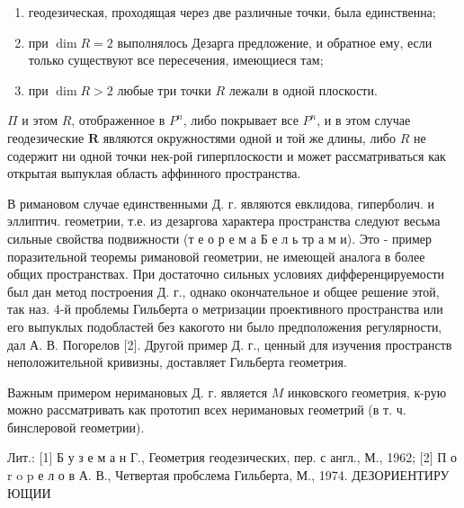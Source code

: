 \documentclass[10pt]{article}
\begin{document}
\begin{enumerate}

  \item геодезическая, проходящая через две различные точки, была единственна;



  \item при $\operatorname{dim} R=2$ выполнялось Дезарга предложение, и обратное ему, если только существуют все пересечения, имеющиеся там;



  \item при $\operatorname{dim} R>2$ любые три точки $R$ лежали в одной плоскости.



\end{enumerate}



$\Pi$ и этом $R$, отображенное в $P^{n}$, либо покрывает все $P^{n}$, и в этом случае геодезические $\boldsymbol{R}$ являются окружностями одной и той же длины, либо $R$ не содержит ни одной точки нек-рой гиперплоскости и может рассматриваться как открытая выпуклая область аффинного пространства.



В римановом случае единственными Д. г. являются евклидова, гиперболич. и эллиптич. геометрии, т.е. из дезаргова характера пространства следуют весьма сильные свойства подвижности (т е о р е м а Б е л ь тр а м и). Это - пример поразительной теоремы римановой геометрии, не имеющей аналога в более общих пространствах. При достаточно сильных условиях дифференцируемости был дан метод построения Д. г., однако окончательное и общее решение этой, так наз. 4-й проблемы Гильберта о метризации проективного пространства или его выпуклых подобластей без какогото ни было предположения регулярности, дал А. В. Погорелов [2]. Другой пример Д. г., ценный для изучения пространств неположительной кривизны, доставляет Гильберта геометрия.



Важным примером неримановых Д. г. является $M$ инковского геометрия, к-рую можно рассматривать как прототип всех неримановых геометрий (в т. ч. бинслеровой геометрии).



Лит.: [1] Б у з е м а н Г., Геометрия геодезических, пер. с англ., М., 1962; [2] П о r o p е л о в А. В., Четвертая пробслема Гильберта, М., 1974. ДЕЗОРИЕНТИРУ ЮЩИИ
\end{document}
